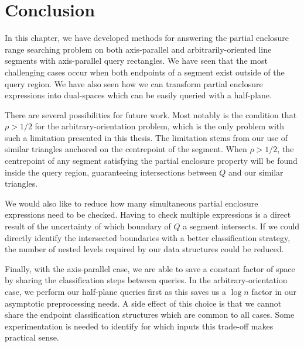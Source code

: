 \section{Conclusion}
\label{:rectangles:concl}

In this chapter, we have developed methods for answering the partial enclosure range searching problem on both axis-parallel and arbitrarily-oriented line segments with axis-parallel query rectangles. 
We have seen that the most challenging cases occur when both endpoints of a segment exist outside of the query region.
We have also seen how we can transform partial enclosure expressions into dual-spaces which can be easily queried with a half-plane.

There are several possibilities for future work.
Most notably is the condition that $\rho > 1/2$ for the arbitrary-orientation problem, which is the only problem with such a limitation presented in this thesis.
The limitation stems from our use of similar triangles anchored on the centrepoint of the segment.
When $\rho > 1/2$, the centrepoint of any segment satisfying the partial enclosure property will be found inside the query region, guaranteeing intersections between $Q$ and our similar triangles.

We would also like to reduce how many simultaneous partial enclosure expressions need to be checked. Having to check multiple expressions is a direct result of the uncertainty of which boundary of $Q$ a segment intersects. If we could directly identify the intersected boundaries with a better classification strategy, the number of nested levels required by our data structures could be reduced.

Finally, with the axis-parallel case, we are able to save a constant factor of space by sharing the classification steps between queries. 
In the arbitrary-orientation case, we perform our half-plane queries first as this saves us a $\log{n}$ factor in our asymptotic preprocessing needs. A side effect of this choice is that we cannot share the endpoint classification structures which are common to all cases.  
Some experimentation is needed to identify for which inputs this trade-off makes practical sense.
